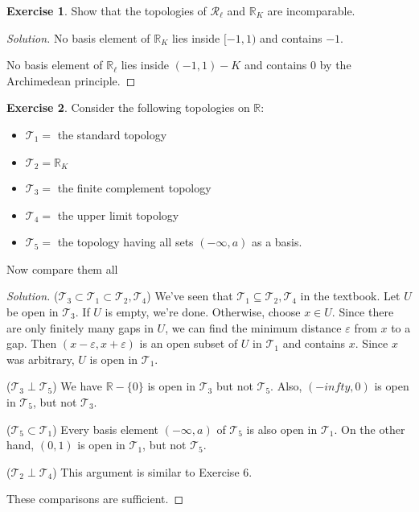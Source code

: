 \documentclass{article}
\theoremstyle{definition}
\newtheorem{exercise}{Exercise}[section]
\begin{document}
\begin{exercise}
  Show that the topologies of $\mathcal{R}_\ell$ and $\mathbb{R}_K$ are incomparable.
\end{exercise}
\begin{proof}[Solution]
  No basis element of $\mathbb{R}_K$ lies inside $[-1,1)$ and contains $-1$.

  No basis element of $\mathbb{R}_\ell$ lies inside $(-1,1) - K$ and contains $0$ by the\\ Archimedean principle.
\end{proof}

\begin{exercise}
  Consider the following topologies on $\mathbb{R}$:
  \begin{itemize}
    \item[] $\mathcal{T}_1 = $ the standard topology
    \item[] $\mathcal{T}_2 = \mathbb{R}_K$
    \item[] $\mathcal{T}_3 = $ the finite complement topology
    \item[] $\mathcal{T}_4 = $ the upper limit topology
    \item[] $\mathcal{T}_5 = $ the topology having all sets $(-\infty, a)$ as a basis.
  \end{itemize}
  Now compare them all
\end{exercise}
\begin{proof}[Solution]
  ($\mathcal{T}_3\subset\mathcal{T}_1\subset\mathcal{T}_2,\mathcal{T}_4$)
  We've seen that $\mathcal{T}_1\subseteq\mathcal{T}_2,\mathcal{T}_4$ in the textbook. Let $U$ be open in $\mathcal{T}_3$. If $U$ is empty, we're done. Otherwise, choose $x\in U$. Since there are only finitely many gaps in $U$, we can find the minimum distance $\varepsilon$ from $x$ to a gap. Then $(x - \varepsilon, x + \varepsilon)$ is an open subset of $U$ in $\mathcal{T}_1$ and contains $x$. Since $x$ was arbitrary, $U$ is open in $\mathcal{T}_1$.

  ($\mathcal{T}_3\perp\mathcal{T}_5$) We have $\mathbb{R}-\{0\}$ is open in $\mathcal{T}_3$ but not $\mathcal{T}_5$. Also, $(-infty, 0)$ is open in $\mathcal{T}_5$, but not $\mathcal{T}_3$.

  ($\mathcal{T}_5\subset \mathcal{T}_1$) Every basis element $(-\infty,a)$ of $\mathcal{T}_5$ is also open in $\mathcal{T}_1$. On the other hand, $(0,1)$ is open in $\mathcal{T}_1$, but not $\mathcal{T}_5$.

  ($\mathcal{T}_2\perp\mathcal{T}_4$) This argument is similar to Exercise 6.

  These comparisons are sufficient. 
\end{proof}
\end{document}
